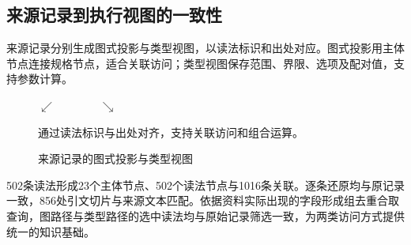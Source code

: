 \subsection{来源记录到执行视图的一致性}
\label{sec:dual-view-validation}

来源记录分别生成图式投影与类型视图，以读法标识和出处对应。图式投影用主体节点连接规格节点，适合关联访问；类型视图保存范围、界限、选项及配对值，支持参数计算。

\begin{figure}[htbp]
\centering\small
{}
\par\vspace{0.6em}$\swarrow\qquad\qquad\searrow$\par\vspace{0.5em}
\begin{minipage}[t]{0.46\textwidth}\centering
{}
\end{minipage}\hfill
\begin{minipage}[t]{0.46\textwidth}\centering
{}
\end{minipage}
\par\vspace{0.7em}
通过读法标识与出处对齐，支持关联访问和组合运算。
\caption{来源记录的图式投影与类型视图}
\label{fig:source-dual-view}
\end{figure}

502条读法形成23个主体节点、502个读法节点与1016条关联。逐条还原均与原记录一致，856处引文切片与来源文本匹配。依据资料实际出现的字段形成\LocalViewQueries{}组去重合取查询，图路径与类型路径的选中读法均与原始记录筛选一致，为两类访问方式提供统一的知识基础。
